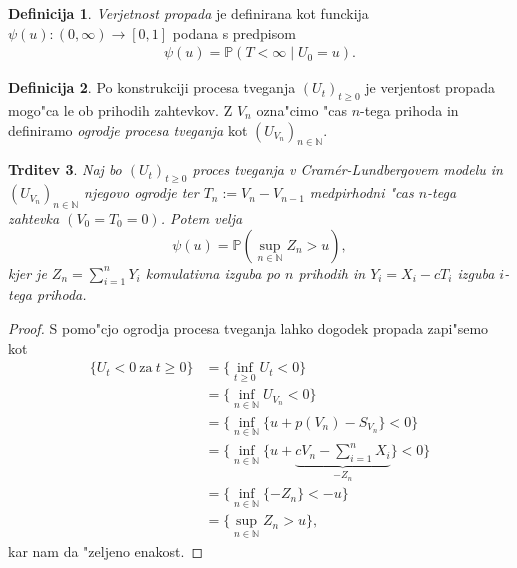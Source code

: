 \documentclass[12pt, a4paper, reqno]{amsart}
\theoremstyle{definition}
\newtheorem{definicija}{Definicija}[section]
\theoremstyle{plain}
\newtheorem{trditev}[definicija]{Trditev}
\newcommand{\N}{\mathbb{N}}
\newcommand{\Prob}{\mathbb{P}}
\newcommand{\1}{\mathds{1}}
\begin{document}
        \begin{definicija}
            \textit{Verjetnost propada} je definirana kot funckija $\psi(u): (0,\infty) \to [0,1]$ 
            podana s predpisom
            \begin{align*}
                \psi(u) = \Prob(T<\infty \mid U_0 = u).
            \end{align*}
            \label{def:VerjetnostPropada}
        \end{definicija}

        \begin{definicija}
            Po konstrukciji procesa tveganja $(U_t)_{t\geq0}$ je verjentost propada mogo"ca le ob 
            prihodih zahtevkov. %
            Z $V_n$ ozna"cimo "cas $n$-tega prihoda in definiramo 
            \textit{ogrodje procesa tveganja} kot $(U_{V_n})_{n\in\N}$.
            \label{def:ogrodjeProcesaTveganja}
        \end{definicija}

        \begin{trditev}
            Naj bo $(U_t)_{t\geq0}$ proces tveganja v Cramér-Lundbergovem modelu in $(U_{V_n})_{n\in\N}$ 
            njegovo ogrodje ter $T_n := V_n - V_{n-1}$ medpirhodni "cas $n$-tega zahtevka 
            $(V_0 = T_0 = 0)$. Potem velja 
            \begin{equation*}
                \psi(u) = \Prob\left(\sup_{n\in\N}Z_n > u\right),
            \end{equation*}
            kjer je $Z_n = \sum_{i=1}^nY_i$  komulativna izguba po $n$ prihodih in $Y_i = X_i - cT_i$
            izguba $i$-tega prihoda.
            \label{trd:verjetnostPropadaZOgrodjem}
        \end{trditev}

        \begin{proof}

            S pomo"cjo ogrodja procesa tveganja lahko dogodek propada zapi"semo kot
            \begin{align*}
                \bigl\{U_t<0 \ \text{za} \ t\geq 0\bigr\} &= 
                                \biggl\{\inf_{t\geq0}U_t<0\biggr\} \\
                              &= \biggl\{\inf_{n\in\N}U_{V_n}<0\biggr\} \\
                              &= \biggl\{\inf_{n\in\N}\bigl\{u + p(V_n) - S_{V_n}\bigr\} < 0\biggr\} \\
                              &= \biggl\{\inf_{n\in\N}\biggl\{u + 
                              \underbrace{cV_n - \sum_{i=1}^nX_i}_{-Z_n}\biggr\} < 0\biggr\} \\
                              &= \biggl\{\inf_{n\in\N}\{-Z_n\} < -u\biggr\} \\
                              &= \biggl\{\sup_{n\in\N}Z_n > u\biggr\},
            \end{align*}
            kar nam da "zeljeno enakost.
        \end{proof}
\end{document}
